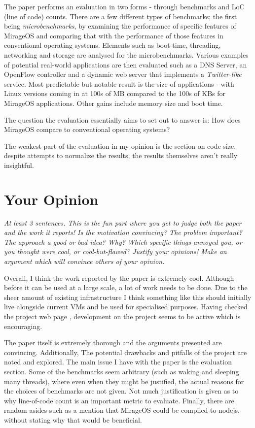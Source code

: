 \documentclass[11pt]{article}
\begin{document}
The paper performs an evaluation in two forms - through benchmarks and LoC
(line of code) counts. There are a few different types of benchmarks; the first
being \textit{microbenchmarks}, by examining the performance of specific
features of MirageOS and comparing that with the performance of those features
in conventional operating systems. Elements such as boot-time, threading,
networking and storage are analysed for the microbenchmarks. Various examples
of potential real-world applications are then evaluated such as a DNS Server,
an OpenFlow controller and a dynamic web server that implements a
\textit{Twitter-like} service. Most predictable but notable result is the size
of applications - with Linux versions coming in at 100s of MB compared to the
100s of KBs for MirageOS applications. Other gains include memory size and boot
time.

The question the evaluation essentially aims to set out to answer is: How does
MirageOS compare to conventional operating systems?

The weakest part of the evaluation in my opinion is the section on code size,
despite attempts to normalize the results, the results themselves aren't really
insightful.

\section*{Your Opinion}

\textsl{At least 3 sentences. This is the fun part where you get to judge both
the paper and the work it reports! Is the motivation convincing? The problem
important? The approach a good or bad idea? Why? Which specific things annoyed
you, or you thought were cool, or cool-but-flawed? Justify your opinions! Make
an argument which will convince others of your opinion.}

Overall, I think the work reported by the paper is extremely cool. Although
before it can be used at a large scale, a lot of work needs to be done. Due to
the sheer amount of existing infrastructure I think something like this should
initially live alongside current VMs and be used for specialised purposes.
Having checked the project web page \cite{MirageOSWeb}, development on the
project seems to be active which is encouraging.

The paper itself is extremely thorough and the arguments presented are
convincing. Additionally, The potential drawbacks and pitfalls of the project
are noted and explored. The main issue I have with the paper is the evaluation
section. Some of the benchmarks seem arbitrary (such as waking and sleeping
many threads), where even when they might be justified, the actual reasons for
the choices of benchmarks are not given. Not much justification is given as to
why line-of-code count is an important metric to evaluate. Finally, there are
random asides such as a mention that MirageOS could be compiled to nodejs,
without stating why that would be beneficial.
\end{document}
